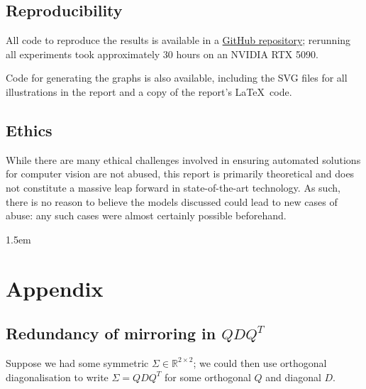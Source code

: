 \documentclass[a4paper, 12pt]{report}
\begin{document}
\section{Reproducibility}
All code to reproduce the results is available in a \href{https://github.com/p-adema/quadratic-conv}{\color{cyan}GitHub repository}; rerunning all experiments took approximately 30 hours on an NVIDIA RTX 5090.

Code for generating the graphs is also available, including the SVG files for all illustrations in the report and a copy of the report's \LaTeX \  code.
\section{Ethics}
While there are many ethical challenges involved in ensuring automated solutions for computer vision are not abused, this report is primarily theoretical and does not constitute a massive leap forward in state-of-the-art technology. As such, there is no reason to believe the models discussed could lead to new cases of abuse: any such cases were almost certainly possible beforehand.



{\footnotesize \emergencystretch 1.5em }


\newpage
{}
\chapter*{Appendix}
\setcounter{section}{0}
\renewcommand\thesection{\Alph{section}}
\section{Redundancy of mirroring in $QDQ^T$}
\label{sec:red-mirr}
Suppose we had some symmetric $\Sigma \in \mathbb{R}^{2\times 2}$; we could then use orthogonal diagonalisation to write $\Sigma = QDQ^T$ for some orthogonal $ Q$ and diagonal $ D$.
\end{document}
